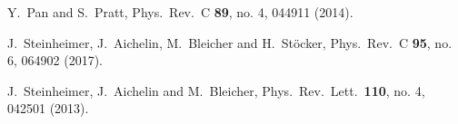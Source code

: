 \documentclass[aps,prc,nofootinbib,showpacs,superscriptaddress,groupedaddress]{revtex4-1}
\begin{document}
\begin{thebibliography}{99}
  Y.~Pan and S.~Pratt,
  Phys.\ Rev.\ C {\bf 89}, no. 4, 044911 (2014).

  J.~Steinheimer, J.~Aichelin, M.~Bleicher and H.~Stöcker,
  Phys.\ Rev.\ C {\bf 95}, no. 6, 064902 (2017).
 
  J.~Steinheimer, J.~Aichelin and M.~Bleicher,
  Phys.\ Rev.\ Lett.\  {\bf 110}, no. 4, 042501 (2013).
  

\end{thebibliography}
\end{document}
